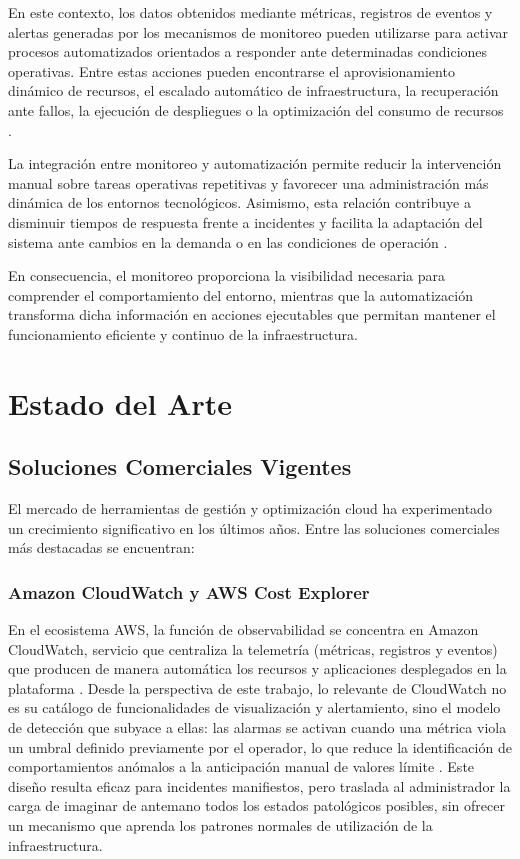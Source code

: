 En este contexto, los datos obtenidos mediante métricas, registros de eventos y alertas generadas por los mecanismos de monitoreo pueden utilizarse para activar procesos automatizados orientados a responder ante determinadas condiciones operativas. Entre estas acciones pueden encontrarse el aprovisionamiento dinámico de recursos, el escalado automático de infraestructura, la recuperación ante fallos, la ejecución de despliegues o la optimización del consumo de recursos \parencite{Ward2014, RedHat2026}.

La integración entre monitoreo y automatización permite reducir la intervención manual sobre tareas operativas repetitivas y favorecer una administración más dinámica de los entornos tecnológicos. Asimismo, esta relación contribuye a disminuir tiempos de respuesta frente a incidentes y facilita la adaptación del sistema ante cambios en la demanda o en las condiciones de operación \parencite{GoogleCloud2026}.

En consecuencia, el monitoreo proporciona la visibilidad necesaria para comprender el comportamiento del entorno, mientras que la automatización transforma dicha información en acciones ejecutables que permitan mantener el funcionamiento eficiente y continuo de la infraestructura.

\section{Estado del Arte}

\subsection{Soluciones Comerciales Vigentes}

El mercado de herramientas de gestión y optimización cloud ha experimentado un crecimiento significativo en los últimos años. Entre las soluciones comerciales más destacadas se encuentran:

\subsubsection{Amazon CloudWatch y AWS Cost Explorer}

En el ecosistema AWS, la función de observabilidad se concentra en Amazon CloudWatch, servicio que centraliza la telemetría (métricas, registros y eventos) que producen de manera automática los recursos y aplicaciones desplegados en la plataforma \parencite{AWS2026}. Desde la perspectiva de este trabajo, lo relevante de CloudWatch no es su catálogo de funcionalidades de visualización y alertamiento, sino el modelo de detección que subyace a ellas: las alarmas se activan cuando una métrica viola un umbral definido previamente por el operador, lo que reduce la identificación de comportamientos anómalos a la anticipación manual de valores límite \parencite{AWS2026}. Este diseño resulta eficaz para incidentes manifiestos, pero traslada al administrador la carga de imaginar de antemano todos los estados patológicos posibles, sin ofrecer un mecanismo que aprenda los patrones normales de utilización de la infraestructura.

